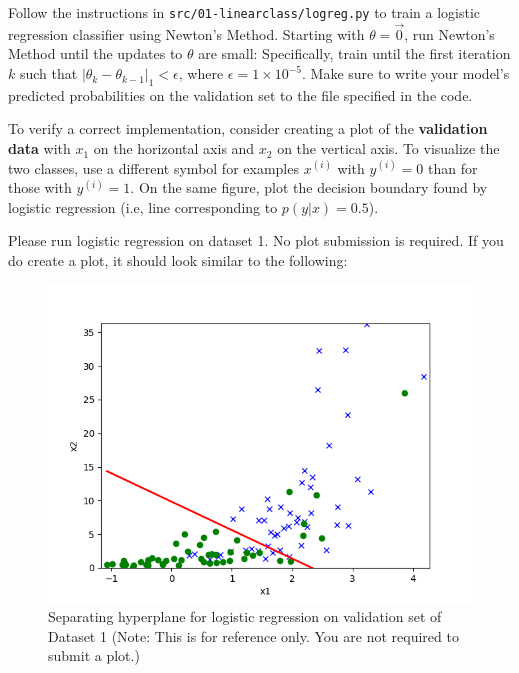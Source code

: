 \item {}
Follow the instructions in \texttt{src/01-linearclass/logreg.py} to train a logistic regression classifier using Newton's Method. Starting with $\theta = \vec{0}$, run Newton's Method until the updates to $\theta$ are small: Specifically,  train until the first iteration $k$ such that $\vert\theta_{k} - \theta_{k-1}\vert_1 < \epsilon$, where $\epsilon = 1\times 10^{-5}$. Make sure to write your model's predicted probabilities on the validation set to the file specified in the code.

To verify a correct implementation, consider creating a plot of the \textbf{validation data} with $x_1$ on the horizontal axis and $x_2$ on the vertical axis. To visualize the two classes, use a different symbol for examples $x^{(i)}$ with $y^{(i)} = 0$ than for those with $y^{(i)} = 1$. On the same figure, plot the decision boundary found by logistic regression (i.e, line corresponding to $p(y\vert x) = 0.5$).

Please run logistic regression on dataset 1. No plot submission is required. If you do create a plot, it should look similar to the following:

\begin{figure}[H]
	\centering
	\vspace{2mm}
	\includegraphics[width=0.65\linewidth]{01-linearclass/p01b_pred_1.png}
    \caption{Separating hyperplane for logistic regression on validation set of Dataset 1 (Note: This is for reference only.  You are not required to submit a plot.)}
\end{figure}
